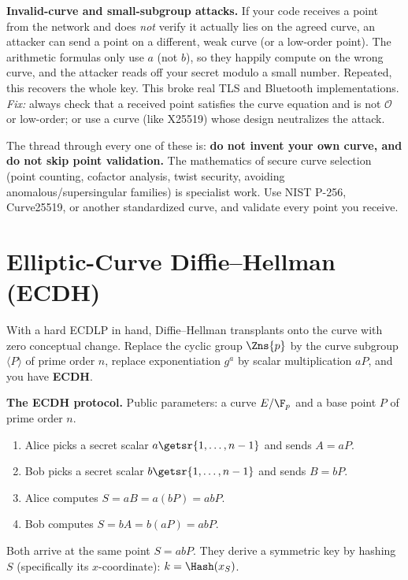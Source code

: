 \begin{attackbox}
\textbf{Invalid-curve and small-subgroup attacks.} If your code receives a point from
the network and does \emph{not} verify it actually lies on the agreed curve, an attacker
can send a point on a different, weak curve (or a low-order point). The arithmetic
formulas only use $a$ (not $b$), so they happily compute on the wrong curve, and the
attacker reads off your secret modulo a small number. Repeated, this recovers the whole
key. This broke real TLS and Bluetooth implementations. \emph{Fix:} always check that a
received point satisfies the curve equation and is not $\mathcal{O}$ or low-order; or use
a curve (like X25519) whose design neutralizes the attack.
\end{attackbox}

\begin{trapbox}
The thread through every one of these is: \textbf{do not invent your own curve, and do
not skip point validation.} The mathematics of secure curve selection (point counting,
cofactor analysis, twist security, avoiding anomalous/supersingular families) is
specialist work. Use NIST P-256, Curve25519, or another standardized curve, and validate
every point you receive.
\end{trapbox}

\section{Elliptic-Curve Diffie--Hellman (ECDH)}
\label{ch21:ecdh}

With a hard ECDLP in hand, Diffie--Hellman transplants onto the curve with zero
conceptual change. Replace the cyclic group $\Zns{p}$ by the curve subgroup
$\langle P\rangle$ of prime order $n$, replace exponentiation $g^a$ by scalar
multiplication $aP$, and you have \textbf{ECDH}.

\begin{focusbox}
\textbf{The ECDH protocol.} Public parameters: a curve $E/\F_p$ and a base point $P$ of
prime order $n$.
\begin{enumerate}
  \item Alice picks a secret scalar $a \getsr \{1,\dots,n-1\}$ and sends $A = aP$.
  \item Bob picks a secret scalar $b \getsr \{1,\dots,n-1\}$ and sends $B = bP$.
  \item Alice computes $S = aB = a(bP) = abP$.
  \item Bob computes $S = bA = b(aP) = abP$.
\end{enumerate}
Both arrive at the same point $S = abP$. They derive a symmetric key by hashing $S$
(specifically its $x$-coordinate): $k = \Hash(x_S)$.
\end{focusbox}

